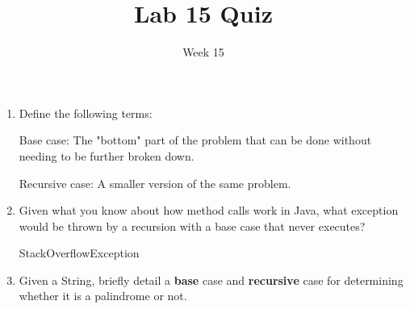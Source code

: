 \documentclass[addpoints]{exam}
\title{Lab 15 Quiz}
\date{Week 15}
\begin{document}
 

\Instructions
\begin{enumerate}
\newline
\item {}
Define the following terms:

\begin{oneparchoices} 
\hspace{0.2cm}
 \vspace{2em}
 \choice Base case: \newline \Ans The "bottom" part of the problem that can be done without needing to be further broken down. \newline \newline
 
 \choice Recursive case: \newline\Ans A smaller version of the same problem.\newline \newline
 
 \end{oneparchoices}
 

 
 
 \item {}
Given what you know about how method calls work in Java, what exception would be thrown by a recursion with a base case that never executes?

 \vspace{2em}
 \Ans StackOverflowException
 \vspace{2em}

 \item {}
Given a String, briefly detail a \textbf{base} case and \textbf{recursive} case for determining whether it is a palindrome or not.


\end{enumerate}
\end{document}
